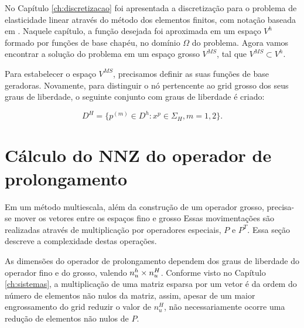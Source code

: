 No Capítulo \ref{ch:discretizacao} foi apresentada a discretização  para o problema de elasticidade linear através do método dos elementos finitos, com notação baseada em \cite{mbuck}. Naquele capítulo, a função desejada foi aproximada em um espaço $V^h$ formado por funções de base chapéu, no domínio $\Omega$ do problema. Agora vamos encontrar a solução do problema em um espaço grosso $V^{MS}$, tal que $V^{MS} \subset V^h$. 



Para estabelecer o espaço $V^{MS}$, precisamos definir as suas funções de base geradoras. 
Novamente, para distinguir o nó pertencente ao grid grosso dos seus graus de liberdade, o seguinte conjunto com graus de liberdade é criado:


\begin{equation}\label{eq:dheq}
    D^H = \{ p^{(m)} \in D^h : x^p \in \Sigma_H, m=1,2\}.
\end{equation}


\section{Cálculo do NNZ do operador de prolongamento}\label{sec:complexProlong}

Em um método multiescala, além da construção de um operador grosso,  precisa-se mover os vetores entre os espaços fino e grosso  Essas movimentações são realizadas através de multiplicação por operadores especiais, $P$ e $P^T$. Essa seção descreve a complexidade destas operações.

As dimensões do operador de prolongamento dependem dos graus de liberdade do operador fino e do  grosso, valendo $n_u^h \times n_u^H$. Conforme visto no Capítulo \ref{ch:sistemas}, a multiplicação de uma matriz esparsa por um vetor é da ordem do número de elementos  não nulos da matriz, assim, apesar de um maior engrossamento do grid reduzir o valor de $n_u^H$,  não necessariamente ocorre  uma redução de elementos não nulos de $P$. 

